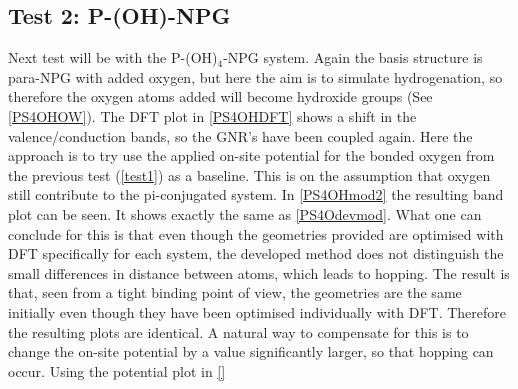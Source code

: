 \subsection{Test 2: P-(OH)-NPG}\label{test2}
Next test will be with the P-(OH)\(_4\)-NPG system. Again the basis structure is para-NPG with added oxygen, but here the aim is to simulate hydrogenation, so therefore the oxygen atoms added will become hydroxide groups (See \cref{PS4OHOW}). The DFT plot in \cref{PS4OHDFT} shows a shift in the valence/conduction bands, so the GNR's have been coupled again. Here the approach is to try use the applied on-site potential for the bonded oxygen from the previous test (\cref{test1}) as a baseline. This is on the assumption that oxygen still contribute to the pi-conjugated system. In \cref{PS4OHmod2} the resulting band plot can be seen. It shows exactly the same as \cref{PS4Odevmod}. What one can conclude for this is that even though the geometries provided are optimised with DFT specifically for each system, the developed method does not distinguish the small differences in distance between atoms, which leads to hopping. The result is that, seen from a tight binding point of view, the geometries are the same initially even though they have been optimised individually with DFT. Therefore the resulting plots are identical. A natural way to compensate for this is to change the on-site potential by a value significantly larger, so that hopping can occur. Using the potential plot in \cref{}
